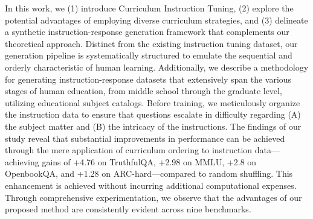 In this work, we (1) introduce Curriculum Instruction Tuning, (2) explore the potential advantages of employing diverse curriculum strategies, and (3) delineate a synthetic instruction-response generation framework that complements our theoretical approach. Distinct from the existing instruction tuning dataset, our generation pipeline is systematically structured to emulate the sequential and orderly characteristic of human learning. Additionally, we describe a methodology for generating instruction-response datasets that extensively span the various stages of human education, from middle school through the graduate level, utilizing educational subject catalogs. Before training, we meticulously organize the instruction data to ensure that questions escalate in difficulty regarding (A) the subject matter and (B) the intricacy of the instructions. The findings of our study reveal that substantial improvements in performance can be achieved through the mere application of curriculum ordering to instruction data—achieving gains of +4.76 on TruthfulQA, +2.98 on MMLU, +2.8 on OpenbookQA, and +1.28 on ARC-hard—compared to random shuffling. This enhancement is achieved without incurring additional computational expenses. Through comprehensive experimentation, we observe that the advantages of our proposed method are consistently evident across nine benchmarks.